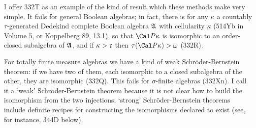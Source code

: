 {I offer 332T as an example of the kind of result which these methods
make very simple.
It fails for general Boolean algebras;  in fact, there is for any $\kappa$ a
countably $\tau$-generated Dedekind complete Boolean algebra $\frak A$ with
cellularity $\kappa$ (514Yb in Volume 5, or {\smc Koppelberg 89}, 13.1),
so that $\Cal P\kappa$ is isomorphic to an order-closed subalgebra of
$\frak A$,
and if $\kappa>\frak c$ then $\tau(\Cal P\kappa)>\omega$ (332R).

For totally finite measure algebras we have a kind of weak
Schr\"oder-Bernstein theorem:  if we have two of them, each isomorphic
to a closed subalgebra of the other, they are isomorphic (332Q).   This
fails for $\sigma$-finite algebras (332Xn).   I call it a `weak'
Schr\"oder-Bernstein theorem because it is not clear how to build the
isomorphism from the two injections;  `strong'
Schr\"oder-Bernstein theorems include definite recipes for constructing
the isomorphisms declared to exist (see, for instance, 344D below).
}%

\discrpage


